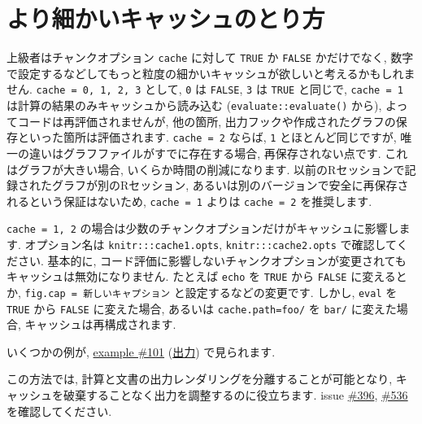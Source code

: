 \documentclass[
]{bxjsreport}
\begin{document}
\hypertarget{ux3088ux308aux7d30ux304bux3044ux30adux30e3ux30c3ux30b7ux30e5ux306eux3068ux308aux65b9}{%
\section*{より細かいキャッシュのとり方}\label{ux3088ux308aux7d30ux304bux3044ux30adux30e3ux30c3ux30b7ux30e5ux306eux3068ux308aux65b9}}

上級者はチャンクオプション \texttt{cache} に対して \texttt{TRUE} か
\texttt{FALSE} かだけでなく,
数字で設定するなどしてもっと粒度の細かいキャッシュが欲しいと考えるかもしれません.
\texttt{cache\ =\ 0,\ 1,\ 2,\ 3} として, \texttt{0} は \texttt{FALSE},
\texttt{3} は \texttt{TRUE} と同じで, \texttt{cache\ =\ 1}
は計算の結果のみキャッシュから読み込む (\texttt{evaluate::evaluate()}
から), よってコードは再評価されませんが, 他の箇所,
出力フックや作成されたグラフの保存といった箇所は評価されます.
\texttt{cache\ =\ 2} ならば, \texttt{1} とほとんど同じですが,
唯一の違いはグラフファイルがすでに存在する場合, 再保存されない点です.
これはグラフが大きい場合, いくらか時間の削減になります.
以前のRセッションで記録されたグラフが別のRセッション,
あるいは別のバージョンで安全に再保存されるという保証はないため,
\texttt{cache\ =\ 1} よりは \texttt{cache\ =\ 2} を推奨します.

\texttt{cache\ =\ 1,\ 2}
の場合は少数のチャンクオプションだけがキャッシュに影響します.
オプション名は \texttt{knitr:::cache1.opts},
\texttt{knitr:::cache2.opts} で確認してください. 基本的に,
コード評価に影響しないチャンクオプションが変更されてもキャッシュは無効になりません.
たとえば \texttt{echo} を \texttt{TRUE} から \texttt{FALSE}
に変えるとか,
\texttt{fig.cap\ =\ \textquotesingle{}新しいキャプション\textquotesingle{}}
と設定するなどの変更です. しかし, \texttt{eval} を \texttt{TRUE} から
\texttt{FALSE} に変えた場合, あるいは
\texttt{cache.path=\textquotesingle{}foo/\textquotesingle{}} を
\texttt{\textquotesingle{}bar/\textquotesingle{}} に変えた場合,
キャッシュは再構成されます.

いくつかの例が, \href{https://github.com/yihui/knitr-examples/}{example
\#101}
(\href{https://github.com/yihui/knitr-examples/blob/master/101-cache-levels.md}{出力})
で見られます.

この方法では, 計算と文書の出力レンダリングを分離することが可能となり,
キャッシュを破棄することなく出力を調整するのに役立ちます. issue
\href{https://github.com/yihui/knitr/issues/396}{\#396},
\href{https://github.com/yihui/knitr/issues/536}{\#536}
を確認してください.
\end{document}
